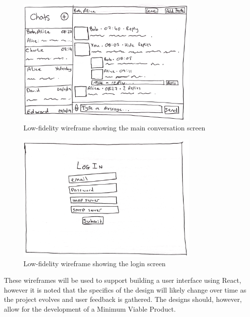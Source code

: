 \begin{figure}[h!]
  \centering
  \includegraphics[width=0.8\textwidth]{images/final-design.png}
  \caption{Low-fidelity wireframe showing the main conversation screen}
  \label{fig:sketch-main} 
\end{figure}

\begin{figure}[h!]
  \centering
  \includegraphics[width=0.8\textwidth]{images/login-design.png}
  \caption{Low-fidelity wireframe showing the login screen}
  \label{fig:sketch-login}
\end{figure}

These wireframes will be used to support building a user interface using React, however it is noted that the specifics of the design will likely change over time as the project evolves and user feedback is gathered. The designs should, however, allow for the development of a Minimum Viable Product.